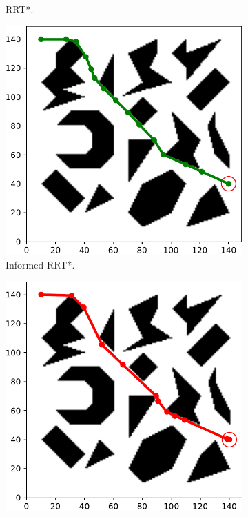 \documentclass{ctuthesis}
\begin{document}
\begin{figure}[!ht]
\begin{subfigure}[b]{0.48\textwidth}
    \caption{RRT*.}
  \end{subfigure}    
  \begin{subfigure}[b]{0.32\textwidth}
    \includegraphics[width=\textwidth]{figChap5/Maze_clutter_final_solution_InformedRRTstar.pdf}  
    \caption{Informed RRT*.}
  \end{subfigure}  
  \begin{subfigure}[b]{0.32\textwidth}
    \includegraphics[width=\textwidth]{figChap5/Maze_clutter_final_solution_RRTsharp.pdf}  

\end{subfigure}
\end{figure}
\end{document}
